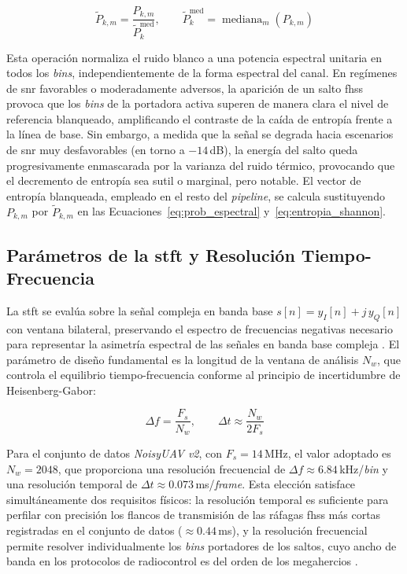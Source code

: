 \begin{equation}
    \tilde{P}_{k,m} = \frac{P_{k,m}}{\tilde{P}_{k}^{\text{med}}}, \qquad \tilde{P}_{k}^{\text{med}} = \operatorname{mediana}_{m}\!\left(P_{k,m}\right)
    \label{eq:whitening}
\end{equation}

Esta operación normaliza el ruido blanco a una potencia espectral unitaria en todos los \textit{bins}, independientemente de la forma espectral del canal. En regímenes de \gls{snr} favorables o moderadamente adversos, la aparición de un salto \gls{fhss} provoca que los \textit{bins} de la portadora activa superen de manera clara el nivel de referencia blanqueado, amplificando el contraste de la caída de entropía frente a la línea de base. Sin embargo, a medida que la señal se degrada hacia escenarios de \gls{snr} muy desfavorables (en torno a $-14$\,dB), la energía del salto queda progresivamente enmascarada por la varianza del ruido térmico, provocando que el decremento de entropía sea sutil o marginal, pero notable. El vector de entropía blanqueada, empleado en el resto del \textit{pipeline}, se calcula sustituyendo $P_{k,m}$ por $\tilde{P}_{k,m}$ en las Ecuaciones~\ref{eq:prob_espectral} y~\ref{eq:entropia_shannon}.

\subsection{Parámetros de la \gls{stft} y Resolución Tiempo-Frecuencia}
\label{subsec:parametros_stft}

La \gls{stft} se evalúa sobre la señal compleja en banda base $s[n] = y_I[n] + j\,y_Q[n]$ con ventana bilateral, preservando el espectro de frecuencias negativas necesario para representar la asimetría espectral de las señales en banda base compleja \cite{oppenheim_discrete_2014}. El parámetro de diseño fundamental es la longitud de la ventana de análisis $N_w$, que controla el equilibrio tiempo-frecuencia conforme al principio de incertidumbre de Heisenberg-Gabor:

\begin{equation}
    \Delta f = \frac{F_s}{N_w}, \qquad \Delta t \approx \frac{N_w}{2 F_s}
    \label{eq:resolucion_stft}
\end{equation}

Para el conjunto de datos \textit{NoisyUAV v2}, con $F_s = 14$\,MHz, el valor adoptado es $N_w = 2048$, que proporciona una resolución frecuencial de $\Delta f \approx 6.84$\,kHz/\textit{bin} y una resolución temporal de $\Delta t \approx 0.073$\,ms/\textit{frame}. Esta elección satisface simultáneamente dos requisitos físicos: la resolución temporal es suficiente para perfilar con precisión los flancos de transmisión de las ráfagas \gls{fhss} más cortas registradas en el conjunto de datos ($\approx 0.44$\,ms), y la resolución frecuencial permite resolver individualmente los \textit{bins} portadores de los saltos, cuyo ancho de banda en los protocolos de radiocontrol es del orden de los megahercios \cite{morge-rollet_drone_2022}.

